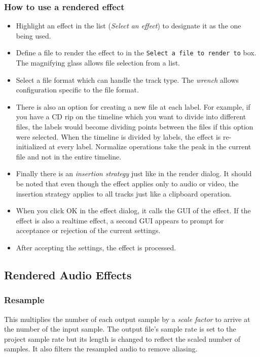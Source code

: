 \subsubsection*{How to use a rendered effect}%
\label{ssub:how_use_rendered_effect}

\begin{itemize}
    \item Highlight an effect in the list (\textit{Select an effect}) to designate it as the one being used.
    \item Define a file to render the effect to in the \texttt{Select a file to render to} box. The magnifying glass allows file selection from a list.
    \item Select a file format which can handle the track type. The \textit{wrench} allows configuration specific to the file format.
    \item There is also an option for creating a new file at each label. For example, if you have a CD rip on the timeline which you want to divide into different files, the labels would become dividing points between the files if this option were selected. When the timeline is divided by labels, the effect is re-initialized at every label. Normalize operations take the peak in the current file and not in the entire timeline.
    \item Finally there is an \textit{insertion strategy} just like in the render dialog. It should be noted that even though the effect applies only to audio or video, the insertion strategy applies to all tracks just like a clipboard operation.
    \item When you click OK in the effect dialog, it calls the GUI of the effect. If the effect is also a realtime effect, a second GUI appears to prompt for acceptance or rejection of the current settings.
    \item After accepting the settings, the effect is processed.
\end{itemize}

\subsection{Rendered Audio Effects}%
\label{sub:renederd_audio_effets}

\subsubsection*{Resample}%
\label{ssub:resample}

This multiplies the number of each output sample by a \textit{scale factor} to arrive at the number of the input sample. The output file's sample rate is set to the project sample rate but its length is changed to reflect the scaled number of samples. It also filters the resampled audio to remove aliasing.

